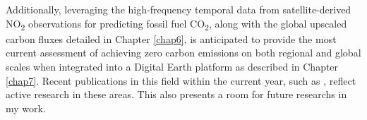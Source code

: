 Additionally, leveraging the high-frequency temporal data from satellite-derived NO\textsubscript{2} observations for predicting fossil fuel CO\textsubscript{2}, along with the global upscaled carbon fluxes detailed in Chapter \ref{chap6}, is anticipated to provide the most current assessment of achieving zero carbon emissions on both regional and global scales when integrated into a Digital Earth platform as described in Chapter \ref{chap7}. Recent publications in this field within the current year, such as \citep{zhang2023quantifying, yang2023using, miyazaki2023predictability}, reflect active research in these areas. This also presents a room for future researchs in my work.\par
